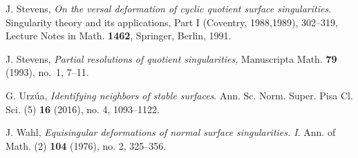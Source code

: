 \documentclass[reqno, twoside, a4paper]{amsart}
\theoremstyle{definition}
\numberwithin{equation}{section}
\begin{document}
\begin{thebibliography}{1}
 J. Stevens, \textit{On the versal deformation of cyclic quotient surface singularities}. Singularity theory and its applications, Part I (Coventry, 1988,1989), 302--319, Lecture Notes in Math. \textbf{1462}, Springer, Berlin, 1991.

 J. Stevens, \emph{Partial resolutions of quotient singularities}, Manuscripta
  Math. \textbf{79} (1993), no.~1, 7--11.

 G. Urz{\'u}a, \textit{Identifying neighbors of stable surfaces}. Ann. Sc. Norm. Super. Pisa Cl. Sci. (5) \textbf{16} (2016), no. 4, 1093--1122.

 J. Wahl, \textit{Equisingular deformations of normal surface singularities. I}. Ann. of Math. (2) \textbf{104} (1976), no. 2, 325--356.
\end{thebibliography}
\end{document}
